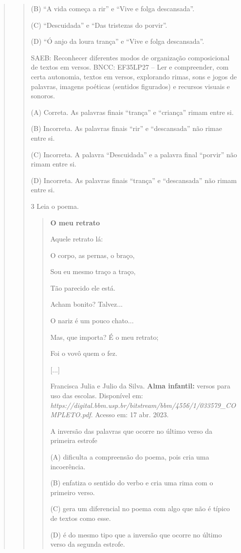 \begin{quote}
\begin{quote}
(B) ``A vida começa a rir'' e ``Vive e folga descansada''.

(C) ``Descuidada'' e ``Das tristezas do porvir''.

(D) ``Ó anjo da loura trança'' e ``Vive e folga descansada''.

SAEB: Reconhecer diferentes modos de organização composicional de textos em versos.
BNCC: EF35LP27 -- Ler e compreender, com certa autonomia, textos em
versos, explorando rimas, sons e jogos de palavras, imagens poéticas
(sentidos figurados) e recursos visuais e sonoros.

(A) Correta. As palavras finais ``trança'' e ``criança'' rimam entre si.

(B) Incorreta. As palavras finais ``rir'' e ``descansada'' não rimae entre si.

(C) Incorreta. A palavra ``Descuidada'' e a palavra final ``porvir'' não rimam entre si.

(D) Incorreta. As palavras finais ``trança'' e ``descansada'' não rimam entre si.

\num{3} Leia o poema.

\begin{quote}
\textbf{O meu retrato}

Aquele retrato lá:

O corpo, as pernas, o braço,

Sou eu mesmo traço a traço,

Tão parecido ele está.


Acham bonito? Talvez...

O nariz é um pouco chato...

Mas, que importa? É o meu retrato;

Foi o vovô quem o fez.

{[}...{]}

Francisca Julia e Julio da Silva. \textbf{Alma infantil:} versos para uso das escolas.
Disponível em: \emph{https://digital.bbm.usp.br/bitstream/bbm/4556/1/033579_COMPLETO.pdf}.
Acesso em: 17 abr. 2023.

A inversão das palavras que ocorre no último verso da primeira estrofe

(A) dificulta a compreensão do poema, pois cria uma incoerência.

(B) enfatiza o sentido do verbo e cria uma rima com o primeiro verso.

(C) gera um diferencial no poema com algo que não é típico de textos como esse.

(D) é do mesmo tipo que a inversão que ocorre no último verso da segunda estrofe.


\end{quote}
\end{quote}
\end{quote}
